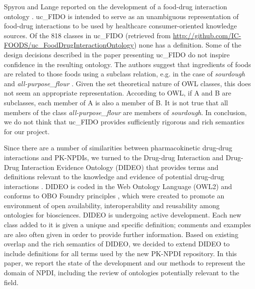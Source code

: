 \documentclass{bmcart}
\begin{document}
Spyrou and Lange reported on the development of a food-drug interaction ontology \cite{Spyrou2016}.
uc\_FIDO is intended to serve as an unambiguous representation of food-drug interactions to be used by healthcare consumer-oriented knowledge sources.
Of the 818 classes in uc\_FIDO (retrieved from \url{http://github.com/IC-FOODS/uc_FoodDrugInteractionOntology}) none has a definition.
Some of the design decisions described in the paper presenting uc\_FIDO do not inspire confidence in the resulting ontology. The authors suggest that ingredients of foods are related to those foods using a subclass relation, e.g. in the case of \textit{sourdough} and \textit{all-purpose\_flour} \cite{Spyrou2016}.
Given the set theoretical nature of OWL classes, this does not seem an appropriate representation.
According to OWL, if A and B are subclasses, each member of A is also a member of B.
It is not true that all members of the class \textit{all-purpose\_flour} are members of \textit{sourdough}.
In  conclusion, we do not think that uc\_FIDO provides sufficiently rigorous and rich semantics for our project.

Since there are a number of similarities between pharmacokinetic drug-drug interactions and PK-NPDIs, we turned to the Drug-drug Interaction and Drug-Drug Interaction Evidence Ontology (DIDEO) \cite{dideoowl} that provides terms and definitions relevant to the knowledge and evidence of potential drug-drug interactions \cite{Brochhausen}.
DIDEO is coded in the Web Ontology Language (OWL2) and conforms to OBO Foundry principles \cite{obofoundry}, which were created to promote an environment of open availability, interoperability and reusability among ontologies for biosciences.
DIDEO is undergoing active development. Each new class added to it is given a unique and specific definition; comments and examples are also often given in order to provide further information.
Based on existing overlap and the rich semantics of DIDEO, we decided to extend DIDEO to include definitions for all terms used by the new PK-NPDI repository. In this paper, we report the state of the development and our methods to represent the domain of NPDI, including the review of ontologies potentially relevant to the field.
\end{document}
